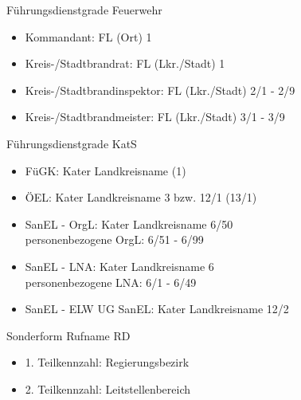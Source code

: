 \begin{hintbox}{Führungsdienstgrade Feuerwehr}
    \begin{itemize}
        \item Kommandant: FL (Ort) 1
        \item Kreis-/Stadtbrandrat: FL (Lkr./Stadt) 1
        \item Kreis-/Stadtbrandinspektor: FL (Lkr./Stadt) 2/1 - 2/9
        \item  Kreis-/Stadtbrandmeister: FL (Lkr./Stadt) 3/1 - 3/9
    \end{itemize}
\end{hintbox}
\begin{hintbox}{Führungsdienstgrade KatS}
    \begin{itemize}
        \item FüGK: Kater Landkreisname (1)
        \item ÖEL: Kater Landkreisname 3 bzw. 12/1 (13/1)
        \item SanEL - OrgL: Kater Landkreisname 6/50\\
        \ra personenbezogene OrgL: 6/51 - 6/99
        \item SanEL - LNA: Kater Landkreisname 6\\
        \ra personenbezogene LNA: 6/1 - 6/49 
        \item SanEL - ELW UG SanEL: Kater Landkreisname 12/2
    \end{itemize}
\end{hintbox}
\begin{hintbox}{Sonderform Rufname RD}
    \begin{itemize}
        \item 1. Teilkennzahl: Regierungsbezirk
        \item 2. Teilkennzahl: Leitstellenbereich
    \end{itemize}
\end{hintbox}